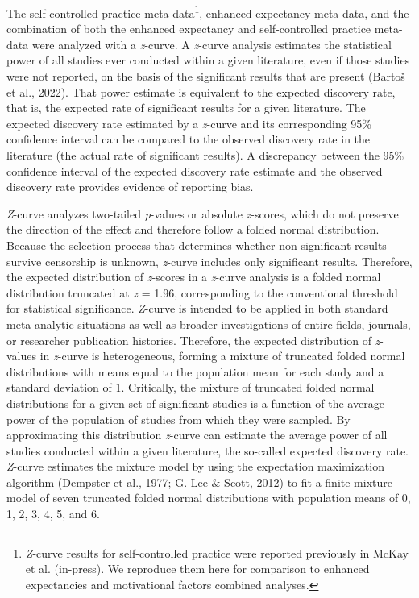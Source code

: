 \documentclass[
  doc, donotrepeattitle,floatsintext]{apa7}
\begin{document}
The self-controlled practice meta-data\footnote{\emph{Z}-curve results for self-controlled practice were reported previously in McKay et al. (in-press). We reproduce them here for comparison to enhanced expectancies and motivational factors combined analyses.}, enhanced expectancy meta-data, and the combination of both the enhanced expectancy and self-controlled practice meta-data were analyzed with a \emph{z}-curve. A \emph{z}-curve analysis estimates the statistical power of all studies ever conducted within a given literature, even if those studies were not reported, on the basis of the significant results that are present (Bartoš et al., 2022). That power estimate is equivalent to the expected discovery rate, that is, the expected rate of significant results for a given literature. The expected discovery rate estimated by a \emph{z}-curve and its corresponding 95\% confidence interval can be compared to the observed discovery rate in the literature (the actual rate of significant results). A discrepancy between the 95\% confidence interval of the expected discovery rate estimate and the observed discovery rate provides evidence of reporting bias.

\emph{Z}-curve analyzes two-tailed \emph{p}-values or absolute \emph{z}-scores, which do not preserve the direction of the effect and therefore follow a folded normal distribution. Because the selection process that determines whether non-significant results survive censorship is unknown, \emph{z}-curve includes only significant results. Therefore, the expected distribution of \emph{z}-scores in a \emph{z}-curve analysis is a folded normal distribution truncated at \emph{z} = 1.96, corresponding to the conventional threshold for statistical significance. \emph{Z}-curve is intended to be applied in both standard meta-analytic situations as well as broader investigations of entire fields, journals, or researcher publication histories. Therefore, the expected distribution of \emph{z}-values in \emph{z}-curve is heterogeneous, forming a mixture of truncated folded normal distributions with means equal to the population mean for each study and a standard deviation of 1. Critically, the mixture of truncated folded normal distributions for a given set of significant studies is a function of the average power of the population of studies from which they were sampled. By approximating this distribution \emph{z}-curve can estimate the average power of all studies conducted within a given literature, the so-called expected discovery rate. \emph{Z}-curve estimates the mixture model by using the expectation maximization algorithm (Dempster et al., 1977; G. Lee \& Scott, 2012) to fit a finite mixture model of seven truncated folded normal distributions with population means of 0, 1, 2, 3, 4, 5, and 6.
\end{document}
